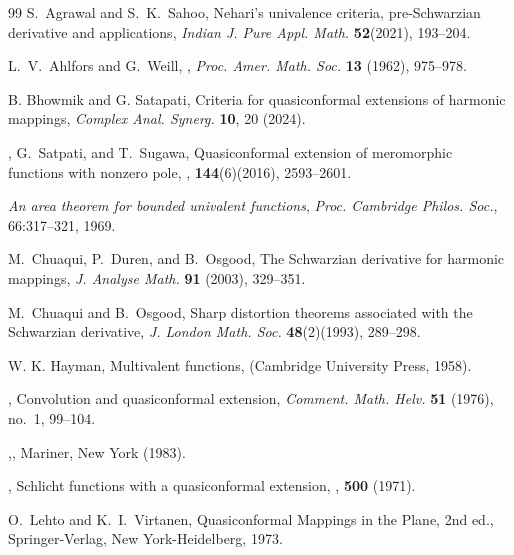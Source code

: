 \documentclass[a4paper,12pt]{amsart}
\theoremstyle{plain}
\theoremstyle{definition}
\begin{document}
\begin{thebibliography}{99}
 {\sc S.~Agrawal} and {\sc S.~K.~Sahoo}, Nehari’s univalence criteria, pre-Schwarzian derivative and applications, \textit{Indian J. Pure Appl. Math.} \textbf{52}(2021), 193–204.

 {\sc L.~V.~Ahlfors} and {\sc G.~Weill},
,
\textit{Proc. Amer. Math. Soc.} {\bf 13} (1962), 975--978.


 {\sc B. Bhowmik} and {\sc G. Satapati}, Criteria for quasiconformal extensions of harmonic mappings, 
\textit{Complex Anal. Synerg.} \textbf{10}, 20 (2024).

, {\sc G.~Satpati}, and {\sc T.~Sugawa}, \newblock Quasiconformal extension of meromorphic functions with nonzero pole, , {\bf 144}(6)(2016), 2593--2601.

 \textit{An area theorem for bounded univalent functions}, \emph{Proc. Cambridge Philos. Soc.}, 66:317--321, 1969.

 {\sc M.~Chuaqui}, {\sc P.~Duren}, and {\sc B.~Osgood}, {The Schwarzian derivative for harmonic mappings}, \textit{J. Analyse Math.} {\bf 91} (2003), 329--351.

 {\sc M.~Chuaqui} and {\sc B.~Osgood}, {Sharp distortion theorems associated with the Schwarzian derivative}, \textit{J. London Math. Soc.}  {\bf 48}(2)(1993), 289--298.

 {\sc W. K. Hayman}, Multivalent functions, (Cambridge University Press, 1958).

, {Convolution and quasiconformal extension}, \textit{Comment. Math. Helv.} \textbf{51} (1976), no.~1, 99--104. 

,, Mariner, New York (1983).

, \newblock Schlicht functions with a quasiconformal extension, , {\bf 500} (1971).

{\sc O.~Lehto} and {\sc K.~I.~Virtanen},
{Quasiconformal Mappings in the Plane},
\newblock 2nd ed., Springer-Verlag, New York-Heidelberg, 1973.


\end{thebibliography}
\end{document}
